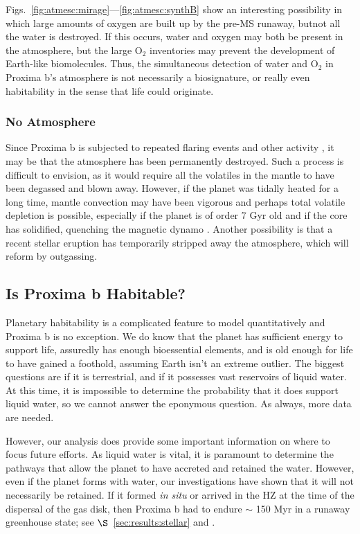\documentclass[preprint,12pt]{aastex}
\begin{document}
Figs.~\ref{fig:atmesc:mirage}---\ref{fig:atmesc:synthB} show an
interesting possibility in which large amounts of oxygen are built up
by the pre-MS runaway, butnot all the water is destroyed. If this
occurs, water and oxygen may both be present in the atmosphere, but
the large O$_2$ inventories may prevent the development of Earth-like
biomolecules. Thus, the simultaneous detection of water and O$_2$ in
Proxima b's atmosphere is not necessarily a biosignature, or really
even habitability in the sense that life could originate.

\subsubsection{No Atmosphere}
\label{sec:results:atmstates:noatmos}

Since Proxima b is subjected to repeated flaring events and other
activity \citep{Walker81,Davenport16}, it may be that the atmosphere
has been permanently destroyed. Such a process is difficult to
envision, as it would require all the volatiles in the mantle to have
been degassed and blown away. However, if the planet was tidally
heated for a long time, mantle convection may have been vigorous and
perhaps total volatile depletion is possible, especially if the planet
is of order 7 Gyr old and if the core has solidified, quenching the
magnetic dynamo \citep{DriscollBarnes15}. Another possibility is that
a recent stellar eruption has temporarily stripped away the
atmosphere, which will reform by outgassing.

\subsection{Is Proxima b Habitable?}
\label{sec:results:habitable}

Planetary habitability is a complicated feature to model
quantitatively and Proxima b is no exception. We do know that the
planet has sufficient energy to support life, assuredly has enough
bioessential elements, and is old enough for life to have gained a
foothold, assuming Earth isn't an extreme outlier. The biggest
questions are if it is terrestrial, and if it possesses vast reservoirs
of liquid water. At this time, it is impossible to determine the
probability that it does support liquid water, so we cannot answer the
eponymous question. As always, more data are needed.

However, our analysis does provide some important information on where
to focus future efforts. As liquid water is vital, it is paramount to
determine the pathways that allow the planet to have accreted and
retained the water. However, even if the planet forms with water, our
investigations have shown that it will not necessarily be retained. If
it formed {\it in situ} or arrived in the HZ at the time of the
dispersal of the gas disk, then Proxima b had to endure $\sim$ 150
Myr in a runaway greenhouse state; see $\S$~\ref{sec:results:stellar} and
\cite{LugerBarnes15}.
\end{document}
